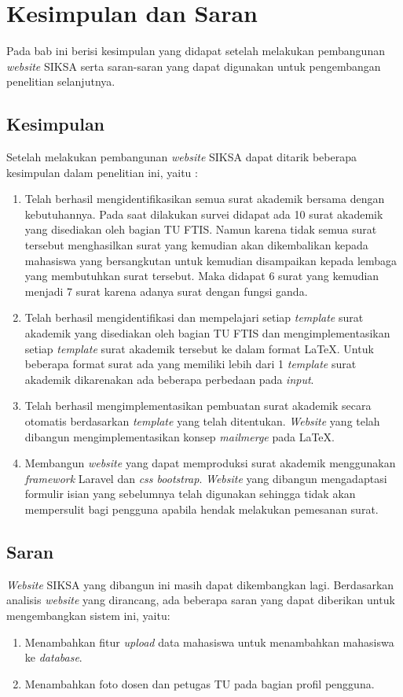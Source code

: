 \chapter{Kesimpulan dan Saran}
\label{chap:kesimpulan_dan_saran}

Pada bab ini berisi kesimpulan yang didapat setelah melakukan pembangunan \textit{website} SIKSA serta saran-saran yang dapat digunakan untuk pengembangan penelitian selanjutnya.

\section{Kesimpulan}
\label{sec:kesimpulan}
Setelah melakukan pembangunan \textit{website} SIKSA dapat ditarik beberapa kesimpulan dalam penelitian ini, yaitu :
\begin{enumerate}
	\item Telah berhasil mengidentifikasikan semua surat akademik bersama dengan kebutuhannya. Pada saat dilakukan survei didapat ada 10 surat akademik yang disediakan oleh bagian TU FTIS. Namun karena tidak semua surat tersebut menghasilkan surat yang kemudian akan dikembalikan kepada mahasiswa yang bersangkutan untuk kemudian disampaikan kepada lembaga yang membutuhkan surat tersebut. Maka didapat 6 surat yang kemudian menjadi 7 surat karena adanya surat dengan fungsi ganda.
	\item Telah berhasil mengidentifikasi dan mempelajari setiap \textit{template} surat akademik yang disediakan oleh bagian TU FTIS dan mengimplementasikan setiap \textit{template} surat akademik tersebut ke dalam format \LaTeX. Untuk beberapa format surat ada yang memiliki lebih dari 1 \textit{template} surat akademik dikarenakan ada beberapa perbedaan pada \textit{input}.
	\item Telah berhasil mengimplementasikan pembuatan surat akademik secara otomatis berdasarkan \textit{template} yang telah ditentukan. \textit{Website} yang telah dibangun mengimplementasikan konsep \textit{mailmerge} pada \LaTeX.
	\item Membangun \textit{website} yang dapat memproduksi surat akademik menggunakan \textit{framework} Laravel dan \textit{css bootstrap}. \textit{Website} yang dibangun mengadaptasi formulir isian yang sebelumnya telah digunakan sehingga tidak akan mempersulit bagi pengguna apabila hendak melakukan pemesanan surat.

\end{enumerate}

\section{Saran}
\label{sec:saran}
\textit{Website} SIKSA yang dibangun ini masih dapat dikembangkan lagi. Berdasarkan analisis \textit{website} yang dirancang, ada beberapa saran yang dapat diberikan untuk mengembangkan sistem ini, yaitu:
\begin{enumerate}
	\item Menambahkan fitur \textit{upload} data mahasiswa untuk menambahkan mahasiswa ke \textit{database}.
	\item Menambahkan foto dosen dan petugas TU pada bagian profil pengguna.
\end{enumerate}